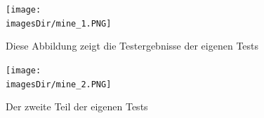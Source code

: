 \documentclass[11pt, a4paper, twoside]{article}   	%
\newcommand{\imagesDir}{images}
\begin{document}
\begin{figure}[h]
	\centering
	\texttt{[image: \\imagesDir/mine\_1.PNG]}
	\caption
	{Diese Abbildung zeigt die Testergebnisse der eigenen Tests}
\end{figure}
\newpage

\begin{figure}[h]
	\centering
	\texttt{[image: \\imagesDir/mine\_2.PNG]}
	\caption
	{Der zweite Teil der eigenen Tests}
\end{figure}
\newpage 
\end{document}
